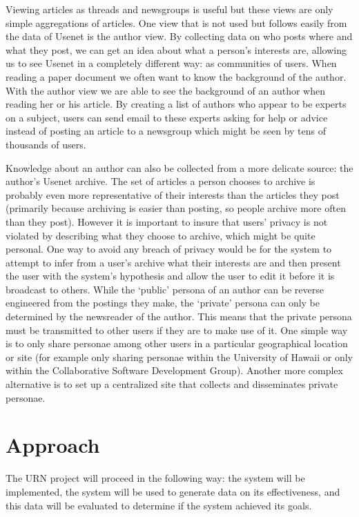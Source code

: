 Viewing articles as threads and newsgroups is useful but these views are only
simple aggregations of articles. One view that is not used but follows
easily from the data of Usenet is the author view. By collecting data on who
posts where and what they post, we can get an idea about what a person's
interests are, allowing us to see Usenet in a completely different way: as
communities of users. When reading a paper document we often want to know
the background of the author. With the author view we are able to see the
background of an author when reading her or his article. By creating a list
of authors who appear to be experts on a subject, users can send email to
these experts asking for help or advice instead of posting an article to a
newsgroup which might be seen by tens of thousands of users.

Knowledge about an author can also be collected from a more delicate source:
the author's Usenet archive. The set of articles a person chooses to archive
is probably even more representative of their interests than the articles
they post (primarily because archiving is easier than posting, so people
archive more often than they post). However it is important to insure that
users' privacy is not violated by describing what they choose to archive,
which might be quite personal. One way to avoid any breach of privacy would
be for the system to attempt to infer from a user's archive what their
interests are and then present the user with the system's hypothesis and
allow the user to edit it before it is broadcast to others. While the
`public' persona of an author can be reverse engineered from the postings
they make, the `private' persona can only be determined by the newsreader of
the author. This means that the private persona must be transmitted to other
users if they are to make use of it. One simple way is to only share
personae among other users in a particular geographical location or site
(for example only sharing personae within the University of Hawaii or only
within the Collaborative Software Development Group). Another more complex
alternative is to set up a centralized site that collects and disseminates
private personae.

\section{Approach}  

The URN project will proceed in the following way: the system will be
implemented, the system will be used to generate data on its
effectiveness, and this data will be evaluated to determine if the
system achieved its goals.


